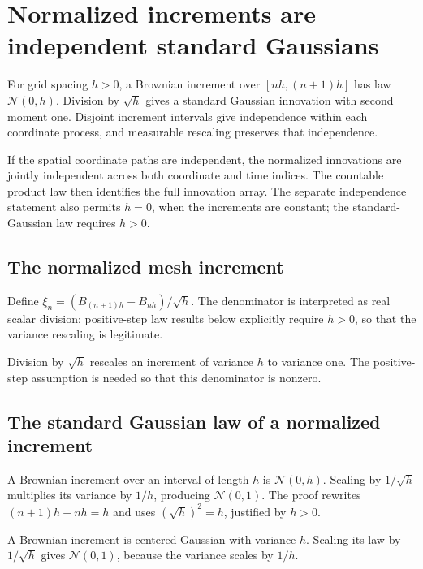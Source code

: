 \documentclass[11pt,a4paper]{article}
\begin{document}
\section{\texorpdfstring{Normalized increments are independent standard Gaussians}{Normalized increments are independent standard Gaussians}}


For grid spacing \(h>0\), a Brownian increment over \([nh,(n+1)h]\) has law \(\mathcal N(0,h)\). Division by \(\sqrt h\) gives a standard Gaussian innovation with second moment one. Disjoint increment intervals give independence within each coordinate process, and measurable rescaling preserves that independence.



If the spatial coordinate paths are independent, the normalized innovations are jointly independent across both coordinate and time indices. The countable product law then identifies the full innovation array. The separate independence statement also permits \(h=0\), when the increments are constant; the standard-Gaussian law requires \(h>0\).


\subsection{\texorpdfstring{The normalized mesh increment}{The normalized mesh increment}}


Define \(\xi_n=(B_{(n+1)h}-B_{nh})/\sqrt h\). The denominator is interpreted as real scalar division; positive-step law results below explicitly require \(h>0\), so that the variance rescaling is legitimate.



Division by \(\sqrt h\) rescales an increment of variance \(h\) to variance one. The positive-step assumption is needed so that this denominator is nonzero.


\subsection{\texorpdfstring{The standard Gaussian law of a normalized increment}{The standard Gaussian law of a normalized increment}}


A Brownian increment over an interval of length \(h\) is \(\mathcal N(0,h)\). Scaling by \(1/\sqrt h\) multiplies its variance by \(1/h\), producing \(\mathcal N(0,1)\). The proof rewrites \((n+1)h-nh=h\) and uses \((\sqrt h)^2=h\), justified by \(h>0\).



A Brownian increment is centered Gaussian with variance \(h\). Scaling its law by \(1/\sqrt h\) gives \(\mathcal N(0,1)\), because the variance scales by \(1/h\).
\end{document}
